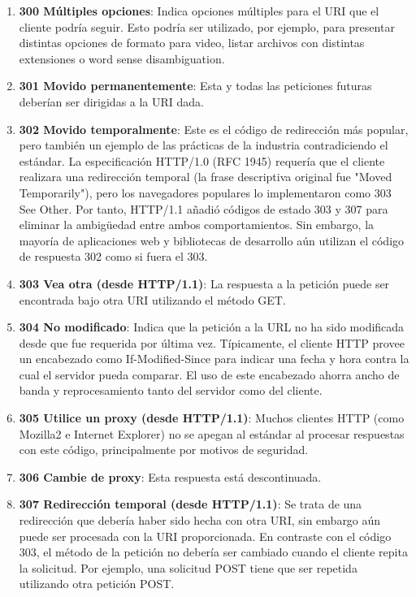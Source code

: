 \begin{enumerate}
\item \textbf{300 Múltiples opciones}: Indica opciones múltiples para el URI que el cliente podría seguir. Esto podría ser utilizado, por ejemplo, para presentar distintas opciones de formato para video, listar archivos con distintas extensiones o word sense disambiguation.
\item \textbf{301 Movido permanentemente}: Esta y todas las peticiones futuras deberían ser dirigidas a la URI dada.
\item \textbf{302 Movido temporalmente}: Este es el código de redirección más popular, pero también un ejemplo de las prácticas de la industria contradiciendo el estándar. La especificación HTTP/1.0 (RFC 1945) requería que el cliente realizara una redirección temporal (la frase descriptiva original fue "Moved Temporarily"), pero los navegadores populares lo implementaron como 303 See Other. Por tanto, HTTP/1.1 añadió códigos de estado 303 y 307 para eliminar la ambigüedad entre ambos comportamientos. Sin embargo, la mayoría de aplicaciones web y bibliotecas de desarrollo aún utilizan el código de respuesta 302 como si fuera el 303.
\item \textbf{303 Vea otra (desde HTTP/1.1)}: La respuesta a la petición puede ser encontrada bajo otra URI utilizando el método GET.
\item \textbf{304 No modificado}: Indica que la petición a la URL no ha sido modificada desde que fue requerida por última vez. Típicamente, el cliente HTTP provee un encabezado como If-Modified-Since para indicar una fecha y hora contra la cual el servidor pueda comparar. El uso de este encabezado ahorra ancho de banda y reprocesamiento tanto del servidor como del cliente.
\item \textbf{305 Utilice un proxy (desde HTTP/1.1)}: Muchos clientes HTTP (como Mozilla2 e Internet Explorer) no se apegan al estándar al procesar respuestas con este código, principalmente por motivos de seguridad.
\item \textbf{306 Cambie de proxy}: Esta respuesta está descontinuada.
\item \textbf{307 Redirección temporal (desde HTTP/1.1)}: Se trata de una redirección que debería haber sido hecha con otra URI, sin embargo aún puede ser procesada con la URI proporcionada. En contraste con el código 303, el método de la petición no debería ser cambiado cuando el cliente repita la solicitud. Por ejemplo, una solicitud POST tiene que ser repetida utilizando otra petición POST.
\end{enumerate}


